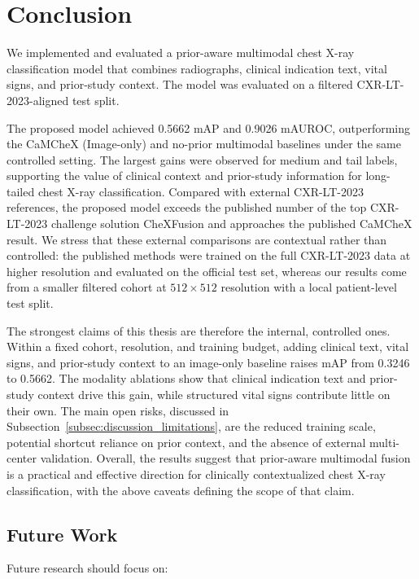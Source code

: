 \section{Conclusion}
\label{sec:conclusion}

We implemented and evaluated a prior-aware multimodal chest X-ray classification model that combines radiographs, clinical indication text, vital signs, and prior-study context. The model was evaluated on a filtered CXR-LT-2023-aligned test split.

The proposed model achieved 0.5662 mAP and 0.9026 mAUROC, outperforming the CaMCheX (Image-only) and no-prior multimodal baselines under the same controlled setting. The largest gains were observed for medium and tail labels, supporting the value of clinical context and prior-study information for long-tailed chest X-ray classification. Compared with external CXR-LT-2023 references, the proposed model exceeds the published number of the top CXR-LT-2023 challenge solution CheXFusion and approaches the published CaMCheX result. We stress that these external comparisons are contextual rather than controlled: the published methods were trained on the full CXR-LT-2023 data at higher resolution and evaluated on the official test set, whereas our results come from a smaller filtered cohort at $512 \times 512$ resolution with a local patient-level test split.

The strongest claims of this thesis are therefore the internal, controlled ones. Within a fixed cohort, resolution, and training budget, adding clinical text, vital signs, and prior-study context to an image-only baseline raises mAP from 0.3246 to 0.5662. The modality ablations show that clinical indication text and prior-study context drive this gain, while structured vital signs contribute little on their own. The main open risks, discussed in Subsection~\ref{subsec:discussion_limitations}, are the reduced training scale, potential shortcut reliance on prior context, and the absence of external multi-center validation. Overall, the results suggest that prior-aware multimodal fusion is a practical and effective direction for clinically contextualized chest X-ray classification, with the above caveats defining the scope of that claim.

\subsection{Future Work}
\label{subsec:conclusion_future}

Future research should focus on:


